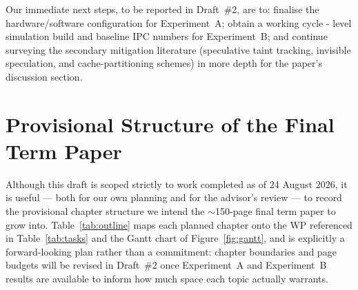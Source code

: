 \documentclass[11pt,a4paper]{article}
\begin{document}
Our immediate next steps, to be reported in Draft~\#2, are to: finalise the
hardware/software configuration for Experiment~A; obtain a working cycle - level simulation
build and baseline IPC numbers for Experiment~B; and continue surveying the
secondary mitigation literature (speculative taint tracking, invisible
speculation, and cache-partitioning schemes) in more depth for the paper's
discussion section.

\section{Provisional Structure of the Final Term Paper}
\label{sec:outline}

Although this draft is scoped strictly to work completed as of 24 August
2026, it is useful --- both for our own planning and for the advisor's
review --- to record the provisional chapter structure we intend the
$\sim$150-page final term paper to grow into. Table~\ref{tab:outline} maps
each planned chapter onto the WP referenced in Table~\ref{tab:tasks} and the
Gantt chart of Figure~\ref{fig:gantt}, and is explicitly a forward-looking
plan rather than a commitment: chapter boundaries and page budgets will be
revised in Draft~\#2 once Experiment~A and Experiment~B results are
available to inform how much space each topic actually warrants.
\end{document}

